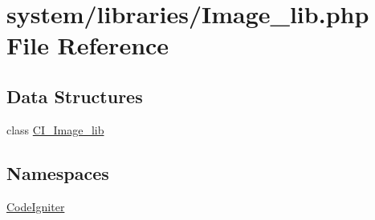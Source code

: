 \hypertarget{_image__lib_8php}{\section{system/libraries/\-Image\-\_\-lib.php File Reference}
\label{_image__lib_8php}
}
\subsection*{Data Structures}
\begin{DoxyCompactItemize}
\item 
class \hyperlink{class_c_i___image__lib}{C\-I\-\_\-\-Image\-\_\-lib}
\end{DoxyCompactItemize}
\subsection*{Namespaces}
\begin{DoxyCompactItemize}
\item 
\hyperlink{namespace_code_igniter}{Code\-Igniter}
\end{DoxyCompactItemize}
